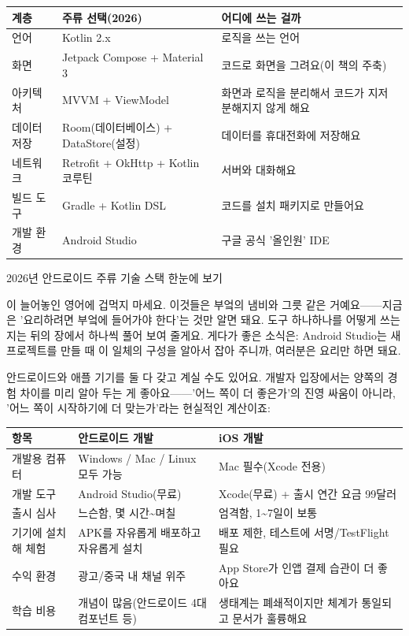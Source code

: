 \begin{center}
\begin{tabularx}{\linewidth}{|X|X|X|}
\hline
\textbf{계층} & \textbf{주류 선택(2026)} & \textbf{어디에 쓰는 걸까} \tabularnewline
\hline
언어 & Kotlin 2.x & 로직을 쓰는 언어 \tabularnewline
화면 & Jetpack Compose + Material 3 & 코드로 화면을 그려요(이 책의 주축) \tabularnewline
아키텍처 & MVVM + ViewModel & 화면과 로직을 분리해서 코드가 지저분해지지 않게 해요 \tabularnewline
데이터 저장 & Room(데이터베이스) + DataStore(설정) & 데이터를 휴대전화에 저장해요 \tabularnewline
네트워크 & Retrofit + OkHttp + Kotlin 코루틴 & 서버와 대화해요 \tabularnewline
빌드 도구 & Gradle + Kotlin DSL & 코드를 설치 패키지로 만들어요 \tabularnewline
개발 환경 & Android Studio & 구글 공식 '올인원' IDE \tabularnewline
\hline
\end{tabularx}
\end{center}

\begin{center}\small\color{gray}2026년 안드로이드 주류 기술 스택 한눈에 보기\end{center}

이 늘어놓인 영어에 겁먹지 마세요. 이것들은 부엌의 냄비와 그릇 같은 거예요——지금은 '요리하려면 부엌에 들어가야 한다'는 것만 알면 돼요. 도구 하나하나를 어떻게 쓰는지는 뒤의 장에서 하나씩 풀어 보여 줄게요. 게다가 좋은 소식은: Android Studio는 새 프로젝트를 만들 때 이 일체의 구성을 알아서 잡아 주니까, 여러분은 요리만 하면 돼요.


안드로이드와 애플 기기를 둘 다 갖고 계실 수도 있어요. 개발자 입장에서는 양쪽의 경험 차이를 미리 알아 두는 게 좋아요——'어느 쪽이 더 좋은가'의 진영 싸움이 아니라, '어느 쪽이 시작하기에 더 맞는가'라는 현실적인 계산이죠:

\begin{center}
\begin{tabularx}{\linewidth}{|X|X|X|}
\hline
\textbf{항목} & \textbf{안드로이드 개발} & \textbf{iOS 개발} \tabularnewline
\hline
개발용 컴퓨터 & Windows / Mac / Linux 모두 가능 & Mac 필수(Xcode 전용) \tabularnewline
개발 도구 & Android Studio(무료) & Xcode(무료) + 출시 연간 요금 99달러 \tabularnewline
출시 심사 & 느슨함, 몇 시간\textasciitilde{}며칠 & 엄격함, 1\textasciitilde{}7일이 보통 \tabularnewline
기기에 설치해 체험 & APK를 자유롭게 배포하고 자유롭게 설치 & 배포 제한, 테스트에 서명/TestFlight 필요 \tabularnewline
수익 환경 & 광고/중국 내 채널 위주 & App Store가 인앱 결제 습관이 더 좋아요 \tabularnewline
학습 비용 & 개념이 많음(안드로이드 4대 컴포넌트 등) & 생태계는 폐쇄적이지만 체계가 통일되고 문서가 훌륭해요 \tabularnewline
\hline
\end{tabularx}
\end{center}

